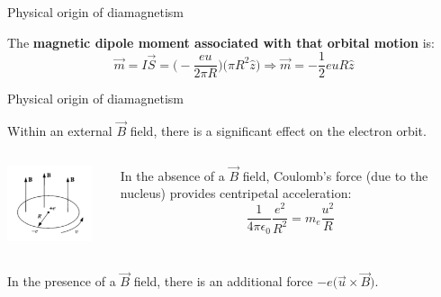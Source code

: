 \begin{frame}{Physical origin of diamagnetism}
\vspace{0.4cm}

The {\bf magnetic dipole moment associated with that orbital motion} is:
\begin{equation*}
  \vec{m} = I \vec{S} = \Big( - \frac{eu}{2\pi R} \Big) \Big( \pi R^2 \hat{z} \Big) \Rightarrow
  \vec{m} = - \frac{1}{2} e u R \hat{z}
\end{equation*}

\end{frame}

%
%
%

\begin{frame}{Physical origin of diamagnetism}

Within an external $\vec{B}$ field, there is a significant effect on the electron orbit.

\begin{columns}
  \begin{column}{0.25\textwidth}
    \begin{center}
      \includegraphics[width=0.90\textwidth]{./images/schematics/orbiting_electron_in_magnetic_field.png}\\
    \end{center}
  \end{column}
  \begin{column}{0.75\textwidth}
     In the absence of a $\vec{B}$ field, Coulomb's force (due to the nucleus) provides centripetal acceleration:
     \begin{equation*}
        \frac{1}{4\pi \epsilon_0} \frac{e^2}{R^2} = m_e \frac{u^2}{R}
     \end{equation*}
  \end{column}
\end{columns}
In the presence of a $\vec{B}$ field, there is an additional force $-e \Big( \vec{u} \times \vec{B} \Big)$.


\end{frame}
